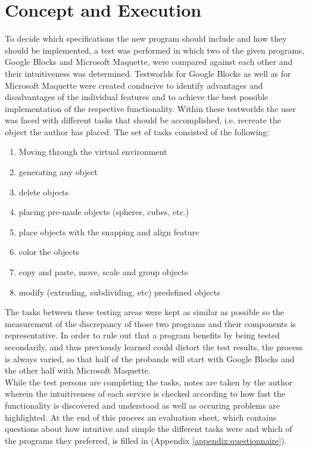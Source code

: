 \documentclass{report}
\begin{document}
	\section{Concept and Execution}	
	\startsection				
		To decide which specifications the new program should include and how they should be implemented, a test was performed in which two of the given programs, Google Blocks and Microsoft Maquette, were compared against each other and their intuitiveness was determined. Testworlds for Google Blocks as well as for Microsoft Maquette were created conducive to identify advantages and disadvantages of the individual features and to achieve the best possible implementation of the respective functionality. Within these testworlds the user was faced with different tasks that should be accomplished, i.e. recreate the object the author has placed. The set of tasks consisted of the following:
		\begin{enumerate}[-]
			\item Moving through the virtual environment
			\item generating any object
			\item delete objects
			\item placing pre-made objects (spheres, cubes, etc.)
			\item place objects with the snapping and align feature
			\item color the objects
			\item copy and paste, move, scale and group objects
			\item modify (extruding, subdividing, etc) predefined objects
		\end{enumerate}		
		The tasks between these testing areas were kept as similar as possible so the measurement of the discrepancy of those two programs and their components is representative. In order to rule out that a program benefits by being tested secondarily, and thus previously learned could distort the test results, the process is always varied, so that half of the probands will start with Google Blocks and the other half with Microsoft Maquette. \\
		While the test persons are completing the tasks, notes are taken by the author wherein the intuitiveness of each service is checked according to how fast the functionality is discovered and understood as well as occuring problems are highlighted. At the end of this process an evaluation sheet, which contains questions about how intuitive and simple the different tasks were and which of the programs they preferred, is filled in (Appendix \ref{appendix:questionnaire}).
	\closesection
\end{document}
